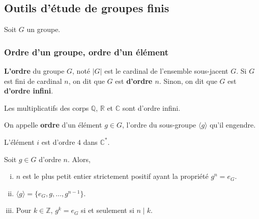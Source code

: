




	\subsection{Outils d'étude de groupes finis}
	
	Soit $G$ un groupe.
	
	\subsubsection{Ordre d'un groupe, ordre d'un élément}
	
	
	\begin{definition}
		\textbf{L'ordre} du groupe $G$, noté $|G|$ est le cardinal de l'ensemble sous-jacent $G$. Si $G$ est fini de cardinal $n$, on dit que $G$ est \textbf{d'ordre $n$}. Sinon, on dit que $G$ est \textbf{d'ordre infini}.
	\end{definition}
	
	\begin{example}
		Les multiplicatifs des corps $\mathbb{Q}$, $\mathbb{R}$ et $\mathbb{C}$ sont d'ordre infini.
	\end{example}
	
	
	\begin{definition}
		On appelle \textbf{ordre} d'un élément $g \in G$, l'ordre du sous-groupe $\langle g \rangle$ qu'il engendre.
	\end{definition}
	
	\begin{example}
		L'élément $i$ est d'ordre $4$ dans $\mathbb{C}^*$.
	\end{example}
	
	\begin{proposition}
		Soit $g \in G$ d'ordre $n$. Alors,
		\begin{enumerate}[(i)]
			\item $n$ est le plus petit entier strictement positif ayant la propriété $g^n = e_G$.
			\item $\langle g \rangle = \{ e_G, g, \dots, g^{n-1} \}$.
			\item Pour $k \in \mathbb{Z}$, $g^k = e_G$ si et seulement si $n \mid k$.
		\end{enumerate}
	\end{proposition}
	
